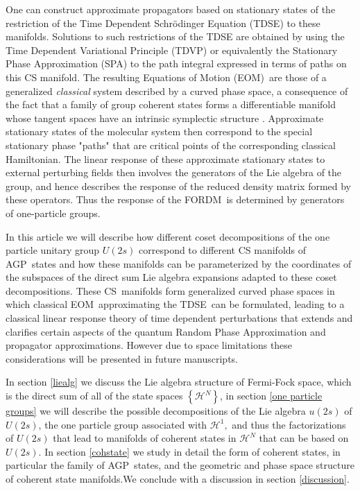 \documentclass[aps,preprint]{revtex4}%
\begin{document}
One can construct approximate propagators based on stationary states of the
restriction of the Time Dependent Schr\"{o}dinger Equation (TDSE) to these
manifolds. Solutions to such restrictions of the TDSE are obtained by using
the Time Dependent Variational Principle (TDVP) \cite{Kramer81} or
equivalently the Stationary Phase Approximation (SPA) \cite{Schulman81} to the
path integral expressed in terms of paths on this CS manifold. The resulting
Equations of Motion (EOM)\ are those of a generalized \emph{classical }system
described by a curved phase space, a consequence of the fact that a family of
group coherent states forms a differentiable manifold \cite{Helgason78} whose
tangent spaces have an intrinsic symplectic structure \cite{Encyclo}.
Approximate stationary states of the molecular system then correspond to the
special stationary phase "paths" that are critical points of the corresponding
classical Hamiltonian. The linear response of these approximate stationary
states to external perturbing fields then involves the generators of the Lie
algebra of the group, and hence describes the response of the reduced density
matrix formed by these operators. Thus the response of the FORDM\ is
determined by generators of one-particle groups.

In this article we will describe how different coset decompositions of the one
particle unitary group $U(2s)$ correspond to different CS manifolds of
AGP\ states and how these manifolds can be parameterized by the coordinates of
the subspaces of the direct sum Lie algebra expansions adapted to these coset
decompositions. These CS\ manifolds form generalized curved phase spaces in
which classical EOM\ approximating the TDSE\ can be formulated, leading to a
classical linear response theory of time dependent perturbations that extends
and clarifies certain aspects of the quantum Random Phase Approximation and
propagator approximations. However due to space limitations these
considerations will be presented in future manuscripts.

In section \ref{liealg} we discuss the Lie algebra structure of Fermi-Fock
space, which is the direct sum of all of the state spaces $\left\{
\mathcal{H}^{N}\right\}  $, in section \ref{one particle groups} we will
describe the possible decompositions of the Lie algebra $u\left(  2s\right)  $
of $U(2s)$, the one particle group associated with $\mathcal{H}^{1},$ and thus
the factorizations of $U(2s)$ that lead to manifolds of coherent states in
$\mathcal{H}^{N}$ that can be based on $U(2s)$. In section \ref{cohstate} we
study in detail the form of coherent states, in particular the family of
AGP\ states, and the geometric and phase space structure of coherent state
manifolds.We conclude with a discussion in section \ref{discussion}.
\end{document}
